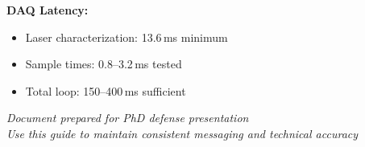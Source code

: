\documentclass[11pt,a4paper]{article}
\begin{document}
\textbf{DAQ Latency:}
\begin{itemize}
\item Laser characterization: 13.6\,ms minimum
\item Sample times: 0.8--3.2\,ms tested
\item Total loop: 150--400\,ms sufficient
\end{itemize}

\vfill
\noindent\textit{Document prepared for PhD defense presentation}\\
\textit{Use this guide to maintain consistent messaging and technical accuracy}
\end{document}
